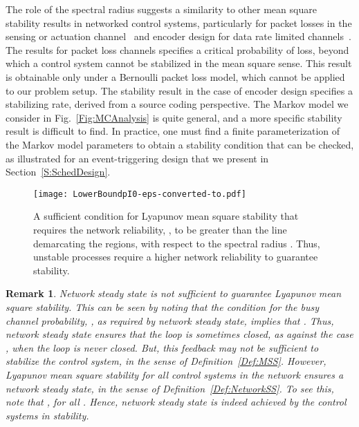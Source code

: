 \documentclass[twocolumn]{autart}
\newtheorem{remark}{Remark}[section]
\begin{document}
The role of the spectral radius suggests a similarity to other mean square stability results in networked control systems, particularly for packet losses in the sensing or actuation channel~\cite{Gupta2010,Kar2012} and encoder design for data rate limited channels~\cite{Nair2004,Tatikonda2004a,Tatikonda2004b}. The results for packet loss channels specifies a critical probability of loss, beyond which a control system cannot be stabilized in the mean square sense. This result is obtainable only under a Bernoulli packet loss model, which cannot be applied to our problem setup. The stability result in the case of encoder design specifies a stabilizing rate, derived from a source coding perspective. The Markov model we consider in Fig.~\ref{Fig:MCAnalysis} is quite general, and a more specific stability result is difficult to find. In practice, one must find a finite parameterization of the Markov model parameters to obtain a stability condition that can be checked, as illustrated for an event-triggering design that we present in Section~\ref{S:SchedDesign}.

\begin{figure*}[tb]
\centering
\texttt{[image: LowerBoundpI0-eps-converted-to.pdf]}
\caption{A sufficient condition for Lyapunov mean square stability that requires the network reliability, , to be greater than the line demarcating the regions, with respect to the spectral radius . Thus, unstable processes require a higher network reliability to guarantee stability. }
\label{Fig:LowerBoundpI0}
\end{figure*}

\begin{remark}\textbf{}
Network steady state is not sufficient to guarantee Lyapunov mean square stability. This can be seen by noting that the condition for the busy channel probability, , as required by network steady state, implies that . Thus, network steady state ensures that the loop is sometimes closed, as against the case , when the loop is never closed. But, this feedback may not be sufficient to stabilize the control system, in the sense of Definition~\ref{Def:MSS}. However, Lyapunov mean square stability for all  control systems in the network ensures a network steady state, in the sense of Definition~\ref{Def:NetworkSS}. To see this, note that , for all . Hence, network steady state is indeed achieved by the control systems in stability.
\end{remark}
\end{document}
